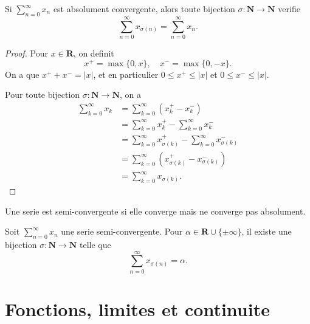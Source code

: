 \begin{theorem}
Si $\sum_{n=0}^{\infty}x_{n}$ est absolument convergente, alors toute bijection $\sigma:\mathbf{N}\to \mathbf{N}$ verifie
$$
\sum_{n=0}^{\infty} x_{\sigma(n)}=\sum_{n=0}^{\infty} x_{n}.
$$
\end{theorem}
\begin{proof}
Pour $x \in \mathbf{R}$, on definit 
$$
x^{+}=\max \{ 0,x \},\quad x^{-}=\max \{ 0,-x \}.
$$
On a que $x^{+}+x^{-}=|x|$, et en particulier $0\le x^{+}\le |x|$ et $0\le x^{-}\le |x|$. 

Pour toute bijection $\sigma:\mathbf{N}\to \mathbf{N}$, on a 
\begin{align*}
\sum_{k=0}^{\infty} x_{k} & =\sum_{k=0}^{\infty} (x_{k}^{+}-x_{k}^{-}) \\
 & =\sum_{k=0}^{\infty} x_{k}^{+}-\sum_{k=0}^{\infty} x_{k}^{-} \\
 & =\sum_{k=0}^{\infty} x_{\sigma(k)}^{+}-\sum_{k=0}^{\infty} x_{\sigma(k)}^{-} \\
 &  =\sum _{k=0}^{\infty}(x_{\sigma(k)}^{+}-x_{\sigma(k)}^{-}) \\
 &   =\sum_{k=0}^{\infty} x_{\sigma(k)}.
\end{align*}
\end{proof}
\begin{definition}
Une serie est semi-convergente si elle converge mais ne converge pas absolument.
\end{definition}
\begin{theorem}
Soit $\sum_{n=0}^{\infty}x_{n}$ une serie semi-convergente. Pour $\alpha \in \mathbf{R}\cup \{ \pm \infty \}$, il existe une bijection $\sigma:\mathbf{N}\to \mathbf{N}$ telle que
$$
\sum_{n=0}^{\infty}  x_{\sigma(n)}=\alpha.
$$
\end{theorem}

\chapter{Fonctions, limites et continuite}

